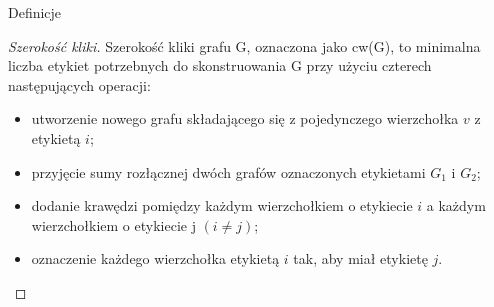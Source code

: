 \documentclass[polish]{beamer}
\begin{document}
\begin{frame}{Definicje}
    \begin{proof}[Szerokość kliki]
        \renewcommand{\qedsymbol}{}
        Szerokość kliki grafu G, oznaczona jako cw(G), to minimalna liczba etykiet potrzebnych do skonstruowania G przy użyciu czterech następujących operacji:
        \begin{itemize}
            \item utworzenie nowego grafu składającego się z pojedynczego wierzchołka $v$ z etykietą $i$; 
            \item przyjęcie sumy rozłącznej dwóch grafów oznaczonych etykietami $G_1$ i $G_2$;
            \item dodanie krawędzi pomiędzy każdym wierzchołkiem o etykiecie $i$ a każdym wierzchołkiem o etykiecie j $(i \neq j)$;
            \item oznaczenie każdego wierzchołka etykietą $i$ tak, aby miał etykietę $j$.
        \end{itemize}
    \end{proof}
\end{frame}
\end{document}
